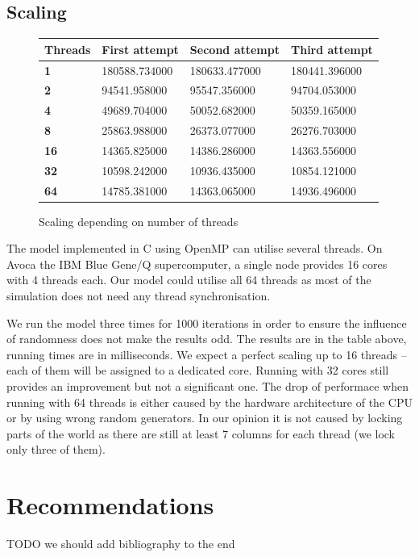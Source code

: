 \documentclass[a4paper]{article}
\begin{document}
\subsection{Scaling}

\begin{figure}[ht]
    \centering
    \begin{tabu} {| X[0.8,c,p] || X[1,c,p] | X[1,c,p] | X[1,c,p] |}
        \rowfont{\bfseries}
        \hline
        Threads &
        First attempt &
        Second attempt&
        Third attempt \\
        \hline
        \hline
        \textbf{1} & 180588.734000 & 180633.477000 & 180441.396000 \\
        \hline
        \textbf{2} & 94541.958000 & 95547.356000 & 94704.053000 \\
        \hline
        \textbf{4} & 49689.704000 & 50052.682000 & 50359.165000 \\
        \hline
        \textbf{8} & 25863.988000 & 26373.077000 & 26276.703000 \\
        \hline
        \textbf{16} & 14365.825000 & 14386.286000 & 14363.556000 \\
        \hline
        \textbf{32} & 10598.242000 & 10936.435000 & 10854.121000 \\
        \hline
        \textbf{64} & 14785.381000 & 14363.065000 & 14936.496000 \\
        \hline
    \end{tabu}
    \caption{Scaling depending on number of threads}
\end{figure}


The model implemented in C using OpenMP can utilise several threads.
On Avoca the IBM Blue Gene/Q supercomputer, a single node provides 16 cores with 4 threads each.
Our model could utilise all 64 threads as most of the simulation does not need any thread synchronisation.

We run the model three times for 1000 iterations in order to ensure the influence of randomness does not make the results odd.
The results are in the table above, running times are in milliseconds.
We expect a perfect scaling up to 16 threads -- each of them will be assigned to a dedicated core.
Running with 32 cores still provides an improvement but not a significant one.
The drop of performace when running with 64 threads is either caused by the hardware architecture of the CPU or by using wrong random generators.
In our opinion it is not caused by locking parts of the world as there are still at least 7 columns for each thread (we lock only three of them).

\section{Recommendations}

TODO we should add bibliography to the end
\end{document}
